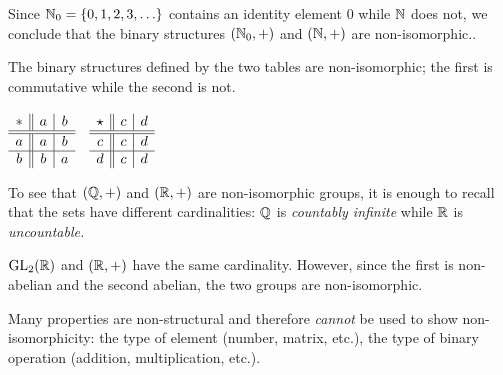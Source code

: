 \begin{examples}{}{}
	\exstart Since $\mathbb{N}_0=\{0,1,2,3,\ldots\}$ contains an identity element 0 while $\mathbb{N}$ does not, we conclude that the binary structures $(\mathbb{N}_0,+)$ and $(\mathbb{N},+)$ are non-isomorphic..

	\begin{enumerate}\setcounter{enumi}{1}\itemsep2pt
	  \begin{minipage}[t]{0.72\linewidth}\vspace{-5pt}
	  	\item The binary structures defined by the two tables are non-isomorphic; the first is commutative while the second is not.
	  \end{minipage}
	  \hfill
	  \begin{minipage}[t]{0.27\linewidth}\vspace{-5pt}
		  \flushright%
		  $\begin{array}[t]{c||c|c}
				* & a & b\\
				\hline\hline a & a & b\\
				\hline b & b & a
		  \end{array}
		  \quad
		  \begin{array}[t]{c||c|c}
				\star & c & d\\
				\hline\hline c & c & d\\
				\hline d & c & d
		  \end{array}$
	  \end{minipage}
	  \par 
	  
	  \item To see that $(\mathbb{Q},+)$ and $(\mathbb{R},+)$ are non-isomorphic groups, it is enough to recall that the sets have different cardinalities: $\mathbb{Q}$ is \emph{countably infinite} while $\mathbb{R}$ is \emph{uncountable.}
	  
	  \item $\mathrm{GL}_2(\mathbb{R})$ and $(\mathbb{R},+)$ have the same cardinality. However, since the first is non-abelian and the second abelian, the two groups are non-isomorphic. 
	\end{enumerate}
\end{examples}

Many properties are non-structural and therefore \emph{cannot} be used to show non-isomorphicity: the type of element (number, matrix, etc.), the type of binary operation (addition, multiplication, etc.).



